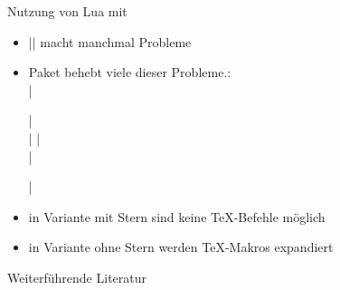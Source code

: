 \documentclass[
	vorläufig=true,
	datum=2017-01-26,
	titel={Komplexe Makros und Befehle},
	web=true,
	max,
]{../tex/latexkurs-slides}
\begin{document}
\begin{frame}[fragile]{Nutzung von Lua mit }
\begin{itemize}
	\item |\directlua| macht manchmal Probleme
	\item Paket  behebt viele dieser Probleme.:\\[1ex]
|\begin{luacode*}|\\
|  |\\
|\end{luacode*}|

	\item in Variante mit Stern sind keine \TeX-Befehle möglich
	\item in Variante ohne Stern werden \TeX-Makros expandiert
\end{itemize}

\end{frame}

\nocite{xparse, interface3, expl3, lualatex-doc-de, luacode}
\begin{frame}[shrink]{Weiterführende Literatur}
\printbibliography
\end{frame}
\end{document}
